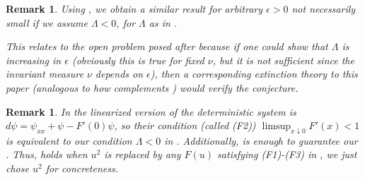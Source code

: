 \documentclass[final]{amsart}
\newtheorem{rem}[thm]{Remark}
\numberwithin{thm}{section}
\numberwithin{equation}{section}
\begin{document}
\begin{rem}
    Using , we obtain a similar result for arbitrary $\epsilon > 0$ not necessarily small if we assume $\Lambda < 0$, for $\Lambda$ as in . 
    
    This relates to the open problem posed after \cite[Remark 2.5]{space-time} because if one could show that $\Lambda$ is increasing in $\epsilon$ (obviously this is true for fixed $\nu$, but it is not sufficient since the invariant measure $\nu$ depends on $\epsilon$), then a corresponding extinction theory to this paper (analogous to how \cite{extinction} complements \cite{persistence}) would verify the conjecture.
\end{rem}

\begin{rem}
    In \cite{space-time} the linearized version of the deterministic system is $d\psi = \psi_{xx} + \psi - F'(0)\psi$, so their condition (called (F2)) $\limsup_{x \downarrow 0} F'(x) < 1$ is equivalent to our condition $\Lambda < 0$ in . Additionally, \cite[Lemma 2.1(2)]{space-time} is enough to guarantee our . Thus,  holds when $u^2$ is replaced by any $F(u)$ satisfying  (F1)-(F3) in \cite{space-time}, we just chose $u^2$ for concreteness.
\end{rem}
\end{document}
